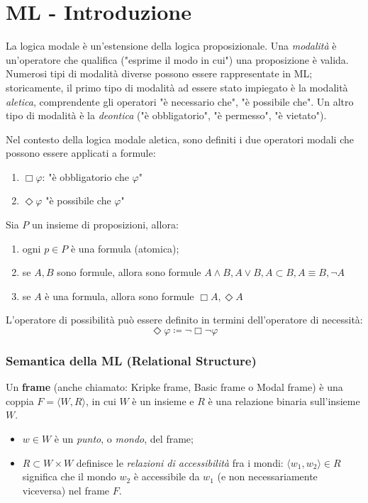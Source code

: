 \chapter{ML - Introduzione}

	La logica modale è un'estensione della logica proposizionale. Una \textit{modalità} è un'operatore che qualifica ("esprime il modo in cui") una proposizione è valida.
	Numerosi tipi di modalità diverse possono essere rappresentate in ML; storicamente, il primo tipo di modalità ad essere stato impiegato è la modalità \textit{aletica}, comprendente gli operatori "è necessario che", "è possibile che". Un altro tipo di modalità è la \textit{deontica} ("è obbligatorio", "è permesso", "è vietato").
	
\begin{fdefinition}
Nel contesto della logica modale aletica, sono definiti i due operatori modali che possono essere applicati a formule:
\begin{enumerate}
\item $\Box \varphi$: "è obbligatorio che $\varphi$"
\item $\Diamond \varphi$ "è possibile che $\varphi$"
\end{enumerate}
Sia $P$ un insieme di proposizioni, allora:
\begin{enumerate}
\item ogni $p \in P$ è una formula (atomica);
\item se $A, B$ sono formule, allora sono formule $A \land B, A \lor B, A \subset B, A \equiv B, \lnot A$
\item se $A$ è una formula, allora sono formule $\Box A, \Diamond A$
\end{enumerate}

L'operatore di possibilità può essere definito in termini dell'operatore di necessità:
$$\Diamond \varphi \coloneqq \lnot \Box \lnot \varphi$$
\end{fdefinition}

\subsection{Semantica della ML (Relational Structure)}
Un \textbf{frame} (anche chiamato: Kripke frame, Basic frame o Modal frame) è una coppia $F = \langle W, R\rangle$, in cui $W$ è un insieme e $R$ è una relazione binaria sull'insieme $W$.
\begin{itemize}
\item $w \in W$ è un \textit{punto}, o \textit{mondo}, del frame;
\item $R \subset W \times W$ definisce le \textit{relazioni di accessibilità} fra i mondi: $\langle w_1, w_2 \rangle \in R$ significa che il mondo $w_2$ è accessibile da $w_1$ (e non necessariamente viceversa) nel frame $F$.
\end{itemize}

